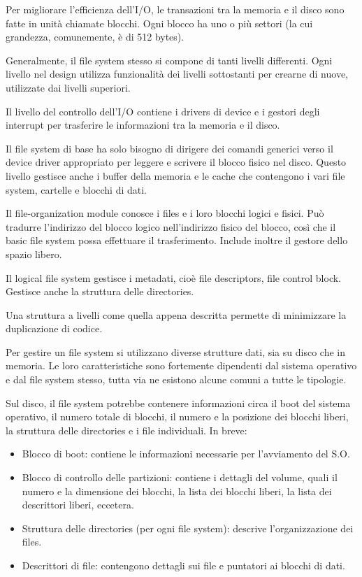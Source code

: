\documentclass[a4paper]{article}
\begin{document}
Per migliorare l'efficienza dell'I/O, le transazioni tra la memoria e il disco sono fatte in unità chiamate blocchi. Ogni blocco ha uno o più settori (la cui grandezza, comunemente, è di 512 bytes).

Generalmente, il file system stesso si compone di tanti livelli differenti. Ogni livello nel design utilizza funzionalità dei livelli sottostanti per crearne di nuove, utilizzate dai livelli superiori.

Il livello del controllo dell'I/O contiene i drivers di device e i gestori degli interrupt per trasferire le informazioni tra la memoria e il disco.

Il file system di base ha solo bisogno di dirigere dei comandi generici verso il device driver appropriato per leggere e scrivere il blocco fisico nel disco. Questo livello gestisce anche i buffer della memoria e le cache che contengono i vari file system, cartelle e blocchi di dati.

Il file-organization module conosce i files e i loro blocchi logici e fisici. Può tradurre l'indirizzo del blocco logico nell'indirizzo fisico del blocco, così che il basic file system possa effettuare il trasferimento. Include inoltre il gestore dello spazio libero.

Il logical file system gestisce i metadati, cioè file descriptors, file control block. Gestisce anche la struttura delle directories.

Una struttura a livelli come quella appena descritta permette di minimizzare la duplicazione di codice.
\newline

Per gestire un file system si utilizzano diverse strutture dati, sia su disco che in memoria. Le loro caratteristiche sono fortemente dipendenti dal sistema operativo e dal file system stesso, tutta via ne esistono alcune comuni a tutte le tipologie.

Sul disco, il file system potrebbe contenere informazioni circa il boot del sistema operativo, il numero totale di blocchi, il numero e la posizione dei blocchi liberi, la struttura delle directories e i file individuali. In breve:
\begin{itemize}
   \item Blocco di boot: contiene le informazioni necessarie per l'avviamento del S.O.
   \item Blocco di controllo delle partizioni: contiene i dettagli del volume, quali il numero e la dimensione dei blocchi, la lista dei blocchi liberi, la lista dei descrittori liberi, eccetera.
   \item Struttura delle directories (per ogni file system): descrive l'organizzazione dei files.
   \item Descrittori di file: contengono dettagli sui file e puntatori ai blocchi di dati.
\end{itemize}
\end{document}
